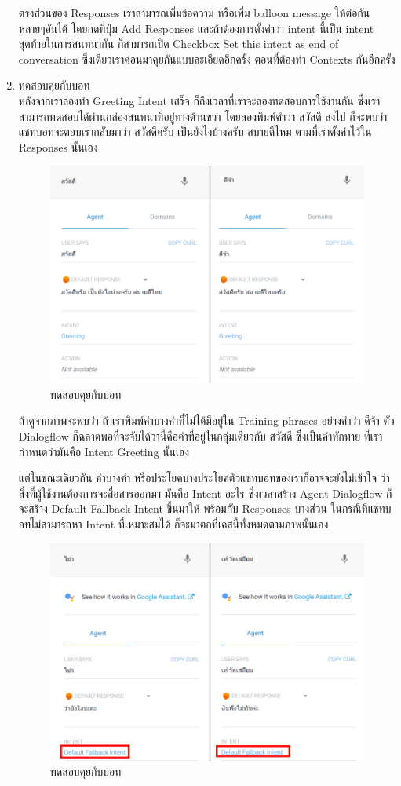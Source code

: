 \begin{enumerate}
	ตรงส่วนของ Responses เราสามารถเพิ่มข้อความ หรือเพิ่ม balloon message ให้ต่อกันหลายๆอันได้ โดยกดที่ปุ่ม Add Responses และถ้าต้องการตั้งค่าว่า intent นี้เป็น intent สุดท้ายในการสนทนากัน ก็สามารถเปิด Checkbox Set this intent as end of conversation ซึ่งเดียวเราค่อนมาคุยกันแบบละเอียดอีกครั้ง ตอนที่ต้องทำ Contexts กันอีกครั้ง

	\item ทดสอบคุยกับบอท \\
	หลังจากเราลองทำ Greeting Intent เสร็จ ก็ถึงเวลาที่เราจะลองทดสอบการใช้งานกัน ซึ่งเราสามารถทดสอบได้ผ่านกล่องสนทนาที่อยู่ทางด้านขวา โดยลองพิมพ์คำว่า สวัสดี ลงไป ก็จะพบว่าแชทบอทจะตอบเรากลับมาว่า สวัสดีครับ เป็นยังไงบ้างครับ สบายดีไหม ตามที่เราตั้งค่าไว้ใน Responses นั้นเอง

	\begin{figure}[H]
		\centering
		\includegraphics[width=0.7\columnwidth]{Figures/2/dialogflow_5}
		\caption{ทดสอบคุยกับบอท}
		\label{Fig:dialogflow5}
	\end{figure}

	ถ้าดูจากภาพจะพบว่า ถ้าเราพิมพ์คำบางคำที่ไม่ได้มีอยู่ใน Training phrases อย่างคำว่า ดีจ้า ตัว Dialogflow ก็ฉลาดพอที่จะจับได้ว่านี่คือคำที่อยู่ในกลุ่มเดียวกับ สวัสดี ซึ่งเป็นคำทักทาย ที่เรากำหนดว่ามันคือ Intent Greeting นั้นเอง

	แต่ในขณะเดียวกัน คำบางคำ หรือประโยคบางประโยคตัวแชทบอทของเราก็อาจจะยังไม่เข้าใจ ว่าสิ่งที่ผู้ใช้งานต้องการจะสื่อสารออกมา มันคือ Intent อะไร ซึ่งเวลาสร้าง Agent Dialogflow ก็จะสร้าง Default Fallback Intent ขึ้นมาให้ พร้อมกับ Responses บางส่วน ในกรณีที่แชทบอทไม่สามารถหา Intent ที่เหมาะสมได้ ก็จะมาตกที่เคสนี้ทั้งหมดตามภาพนั้นเอง

	\begin{figure}[H]
		\centering
		\includegraphics[width=0.7\columnwidth]{Figures/2/dialogflow_6}
		\caption{ทดสอบคุยกับบอท}
		\label{Fig:dialogflow6}
	\end{figure}
\end{enumerate}

